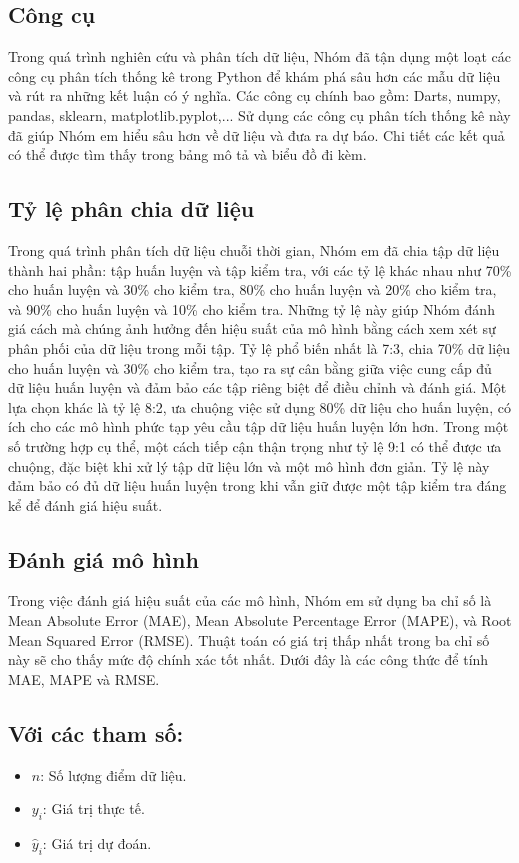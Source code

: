 \subsection{Công cụ}
Trong quá trình nghiên cứu và phân tích dữ liệu, Nhóm đã tận dụng một loạt các công cụ phân tích thống kê trong Python để khám phá sâu hơn các mẫu dữ liệu và rút ra những kết luận có ý nghĩa. Các công cụ chính bao gồm: Darts, numpy, pandas, sklearn, matplotlib.pyplot,... Sử dụng các công cụ phân tích thống kê này đã giúp Nhóm em hiểu sâu hơn về dữ liệu và đưa ra dự báo. Chi tiết các kết quả có thể được tìm thấy trong bảng mô tả và biểu đồ đi kèm.

\subsection{Tỷ lệ phân chia dữ liệu}
Trong quá trình phân tích dữ liệu chuỗi thời gian, Nhóm em đã chia tập dữ liệu thành hai phần: tập huấn luyện và tập kiểm tra, với các tỷ lệ khác nhau như 70\% cho huấn luyện và 30\% cho kiểm tra, 80\% cho huấn luyện và 20\% cho kiểm tra, và 90\% cho huấn luyện và 10\% cho kiểm tra. Những tỷ lệ này giúp Nhóm đánh giá cách mà chúng ảnh hưởng đến hiệu suất của mô hình bằng cách xem xét sự phân phối của dữ liệu trong mỗi tập. Tỷ lệ phổ biến nhất là 7:3, chia 70\% dữ liệu cho huấn luyện và 30\% cho kiểm tra, tạo ra sự cân bằng giữa việc cung cấp đủ dữ liệu huấn luyện và đảm bảo các tập riêng biệt để điều chỉnh và đánh giá. Một lựa chọn khác là tỷ lệ 8:2, ưa chuộng việc sử dụng 80\% dữ liệu cho huấn luyện, có ích cho các mô hình phức tạp yêu cầu tập dữ liệu huấn luyện lớn hơn. Trong một số trường hợp cụ thể, một cách tiếp cận thận trọng như tỷ lệ 9:1 có thể được ưa chuộng, đặc biệt khi xử lý tập dữ liệu lớn và một mô hình đơn giản. Tỷ lệ này đảm bảo có đủ dữ liệu huấn luyện trong khi vẫn giữ được một tập kiểm tra đáng kể để đánh giá hiệu suất. 

\subsection{Đánh giá mô hình}
Trong việc đánh giá hiệu suất của các mô hình, Nhóm em sử dụng ba chỉ số là Mean Absolute Error (MAE), Mean Absolute Percentage Error (MAPE), và Root Mean Squared Error (RMSE). Thuật toán có giá trị thấp nhất trong ba chỉ số này sẽ cho thấy mức độ chính xác tốt nhất. Dưới đây là các công thức để tính MAE, MAPE và RMSE.
\subsection*{Với các tham số: }
\begin{itemize}
    \item \( n \): Số lượng điểm dữ liệu.
    \item \( y_i \): Giá trị thực tế.
    \item \( \hat{y}_i \): Giá trị dự đoán.
\end{itemize}

